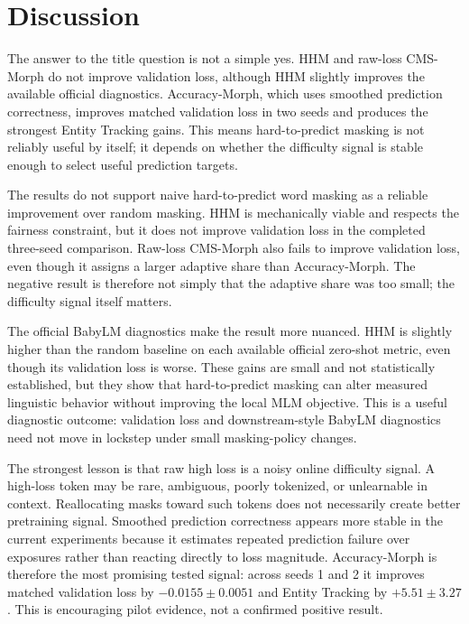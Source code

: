 \section{Discussion}

The answer to the title question is not a simple yes. HHM and raw-loss CMS-Morph do not improve validation loss, although HHM slightly improves the available official diagnostics. Accuracy-Morph, which uses smoothed prediction correctness, improves matched validation loss in two seeds and produces the strongest Entity Tracking gains. This means hard-to-predict masking is not reliably useful by itself; it depends on whether the difficulty signal is stable enough to select useful prediction targets.

The results do not support naive hard-to-predict word masking as a reliable improvement over random masking. HHM is mechanically viable and respects the fairness constraint, but it does not improve validation loss in the completed three-seed comparison. Raw-loss CMS-Morph also fails to improve validation loss, even though it assigns a larger adaptive share than Accuracy-Morph. The negative result is therefore not simply that the adaptive share was too small; the difficulty signal itself matters.

The official BabyLM diagnostics make the result more nuanced. HHM is slightly higher than the random baseline on each available official zero-shot metric, even though its validation loss is worse. These gains are small and not statistically established, but they show that hard-to-predict masking can alter measured linguistic behavior without improving the local MLM objective. This is a useful diagnostic outcome: validation loss and downstream-style BabyLM diagnostics need not move in lockstep under small masking-policy changes.

The strongest lesson is that raw high loss is a noisy online difficulty signal. A high-loss token may be rare, ambiguous, poorly tokenized, or unlearnable in context. Reallocating masks toward such tokens does not necessarily create better pretraining signal. Smoothed prediction correctness appears more stable in the current experiments because it estimates repeated prediction failure over exposures rather than reacting directly to loss magnitude. Accuracy-Morph is therefore the most promising tested signal: across seeds 1 and 2 it improves matched validation loss by $-0.0155 \pm 0.0051$ and Entity Tracking by $+5.51 \pm 3.27$. This is encouraging pilot evidence, not a confirmed positive result.

